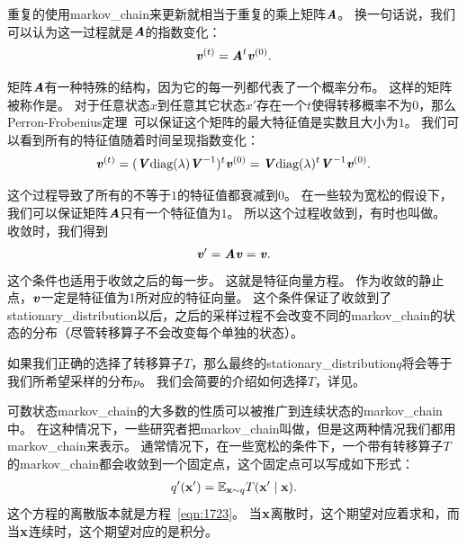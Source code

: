重复的使用\gls{markov_chain}来更新就相当于重复的乘上矩阵$\boldsymbol{\mathit{A}}$。
换一句话说，我们可以认为这一过程就是$\boldsymbol{\mathit{A}}$的指数变化：
\begin{align}
\boldsymbol{\mathit{v}}^{(t)} = \boldsymbol{\mathit{A}}^{t} \boldsymbol{\mathit{v}}^{(0)}.
\end{align}

矩阵$\boldsymbol{\mathit{A}}$有一种特殊的结构，因为它的每一列都代表了一个概率分布。
这样的矩阵被称作是。
对于任意状态$x$到任意其它状态$x'$存在一个$t$使得转移概率不为$0$，那么Perron-Frobenius定理~\citep{perron1907theorie,frobenius1908matrizen}可以保证这个矩阵的最大特征值是实数且大小为$1$。
我们可以看到所有的特征值随着时间呈现指数变化：
\begin{align}
\boldsymbol{\mathit{v}}^{(t)} = (\boldsymbol{\mathit{V}} \text{diag}(\lambda)\boldsymbol{\mathit{V}}^{-1})^{t} \boldsymbol{\mathit{v}}^{(0)} = \boldsymbol{\mathit{V}} \text{diag}(\lambda)^t \boldsymbol{\mathit{V}}^{-1} \boldsymbol{\mathit{v}}^{(0)}.
\end{align}


这个过程导致了所有的不等于$1$的特征值都衰减到$0$。
在一些较为宽松的假设下，我们可以保证矩阵$\boldsymbol{\mathit{A}}$只有一个特征值为$1$。
所以这个过程收敛到，有时也叫做。
收敛时，我们得到
\begin{align}
\label{eqn:1723}
\boldsymbol{\mathit{v}} ' = \boldsymbol{\mathit{A}} \boldsymbol{\mathit{v}} = \boldsymbol{\mathit{v}} .
\end{align}
这个条件也适用于收敛之后的每一步。
这就是特征向量方程。
作为收敛的静止点，$\boldsymbol{\mathit{v}}$一定是特征值为1所对应的特征向量。
这个条件保证了收敛到了\gls{stationary_distribution}以后，之后的采样过程不会改变不同的\gls{markov_chain}的状态的分布（尽管转移算子不会改变每个单独的状态）。

如果我们正确的选择了转移算子$T$，那么最终的\gls{stationary_distribution}$q$将会等于我们所希望采样的分布$p$。
我们会简要的介绍如何选择$T$，详见。


可数状态\gls{markov_chain}的大多数的性质可以被推广到连续状态的\gls{markov_chain}中。
在这种情况下，一些研究者把\gls{markov_chain}叫做，但是这两种情况我们都用\gls{markov_chain}来表示。
通常情况下，在一些宽松的条件下，一个带有转移算子$T$的\gls{markov_chain}都会收敛到一个固定点，这个固定点可以写成如下形式：
\begin{align}
q' (\mathbf{x}') = \mathbb{E}_{\mathbf{x}\sim q}T(\mathbf{x}'\mid \mathbf{x}).
\end{align}
这个方程的离散版本就是方程~\eqref{eqn:1723}。	
当$\mathbf{x}$离散时，这个期望对应着求和，而当$\mathbf{x}$连续时，这个期望对应的是积分。



